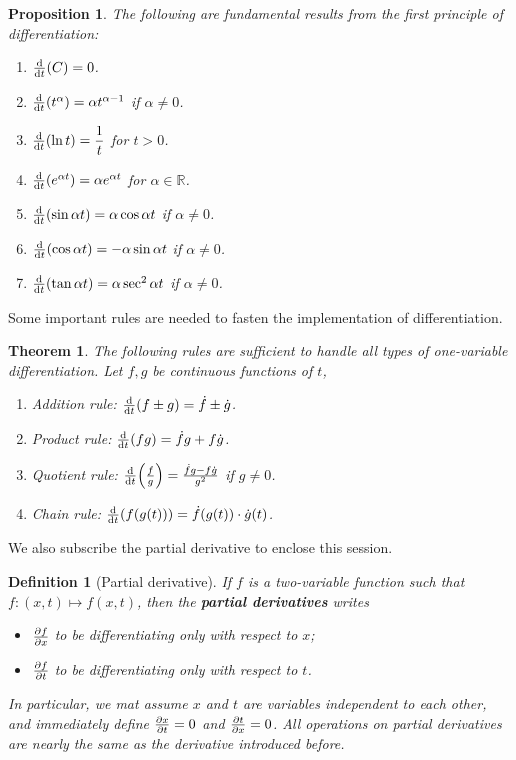 \documentclass[12pt]{article}
\newtheorem{definition}{Definition}[section]
\newtheorem*{theorem}{Theorem}
\newtheorem*{proposition}{Proposition}
\begin{document}
    \begin{proposition}
        The following are fundamental results from the first principle of differentiation:\begin{enumerate}
            \item $\derivative{t}(C) = 0$.
            \item $\derivative{t}(t^{\alpha}) = \alpha t^{\alpha-1}$ if $\alpha\neq 0$.
            \item $\derivative{t}(\ln{t}) = \dfrac{1}{t}$ for $t > 0$.
            \item $\derivative{t}(e^{\alpha t}) = \alpha e^{\alpha t}$ for $\alpha\in \mathbb{R}$.
            \item $\derivative{t}(\sin{\alpha t}) = \alpha \cos{\alpha t}$ if $\alpha\neq 0$.
            \item $\derivative{t}(\cos{\alpha t}) = -\alpha \sin{\alpha t}$ if $\alpha\neq 0$.
            \item $\derivative{t}(\tan{\alpha t}) = \alpha \sec^2{\alpha t}$ if $\alpha\neq 0$.
        \end{enumerate}
    \end{proposition}

    Some important rules are needed to fasten the implementation of differentiation.

    \begin{theorem}
        The following rules are sufficient to handle all types of one-variable differentiation. Let $f,g$ be continuous functions of $t$, \begin{enumerate}
            \item Addition rule: $\derivative{t}(f\pm g)=\Dot{f}\pm\Dot{g}$.
            \item Product rule: $\derivative{t}(fg) = \Dot{f}g+f\Dot{g}$.
            \item Quotient rule: $\derivative{t}(\frac{f}{g}) = \frac{\Dot{f}g-f\Dot{g}}{g^2}$ if $g\neq 0$.
            \item Chain rule: $\derivative{t}(f(g(t))) = \Dot{f}(g(t))\cdot \Dot{g}(t)$.
        \end{enumerate}
    \end{theorem}

    We also subscribe the partial derivative to enclose this session.

    \begin{definition}[Partial derivative]
        If $f$ is a two-variable function such that $f:(x,t)\mapsto f(x,t)$, then the \textbf{partial derivatives} writes \begin{itemize}
            \item $\partialderivative{f}{x}$ to be differentiating only with respect to $x$;
            \item $\partialderivative{f}{t}$ to be differentiating only with respect to $t$.
        \end{itemize}
        In particular, we mat assume $x$ and $t$ are variables independent to each other, and immediately define $\partialderivative{x}{t}=0$ and $\partialderivative{t}{x}=0$. All operations on partial derivatives are nearly the same as the derivative introduced before.
    \end{definition}
\end{document}
